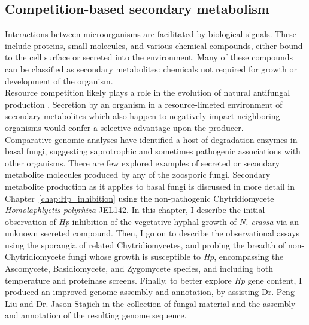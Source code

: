 \subsection{Competition-based secondary metabolism}
Interactions between microorganisms are facilitated by biological signals. These include proteins, small molecules, and various chemical compounds, either bound to the cell surface or secreted into the environment. Many of these compounds can be classified as secondary metabolites: chemicals not required for growth or development of the organism.\\
\indent Resource competition likely plays a role in the evolution of natural antifungal production \cite{(Vicente2003}. Secretion by an organism in a resource-limeted environment of secondary metabolites which also happen to negatively impact neighboring organisms would confer a selective advantage upon the producer. \\
\indent Comparative genomic analyses have identified a host of degradation enzymes in basal fungi, suggesting saprotrophic and sometimes pathogenic associations with other organisms. There are few explored examples of secreted or secondary metabolite molecules produced by any of the zoosporic fungi. 
\indent Secondary metabolite production as it applies to basal fungi is discussed in more detail in Chapter~\ref{chap:Hp_inhibition} using the non-pathogenic Chytridiomycete \textit{Homolaphlyctis polyrhiza} JEL142. In this chapter, I describe the initial observation of \textit{Hp} inhibition of the vegetative hyphal growth of \textit{N. crassa} via an unknown secreted compound. Then, I go on to describe the observational assays using the sporangia of related Chytridiomycetes, and probing the breadth of non-Chytridiomycete fungi whose growth is susceptible to \textit{Hp}, encompassing the Ascomycete, Basidiomycete, and Zygomycete species, and including both temperature and proteinase screens. Finally, to better explore \textit{Hp} gene content, I produced an improved genome assembly and annotation, by assisting Dr. Peng Liu and Dr. Jason Stajich in the collection of fungal material and the assembly and annotation of the resulting genome sequence.\\
